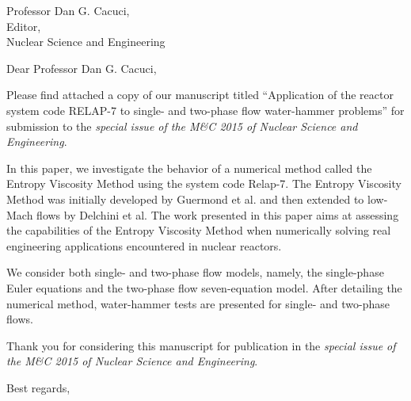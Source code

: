\begin{letter}{Professor Dan G. Cacuci,\\
    Editor,\\
    Nuclear Science and Engineering}
\date{\today}

\opening{Dear Professor Dan G. Cacuci,}
         \vspace{0.25cm}

Please find attached a copy of our manuscript titled ``Application of the reactor system code RELAP-7 to single- and two-phase flow water-hammer problems'' for submission to the {\em special issue of the M\&C 2015 of Nuclear Science and Engineering}.

In this paper, we investigate the behavior of a numerical method called the Entropy Viscosity Method using the system code Relap-7. The Entropy Viscosity Method was initially developed by Guermond et al. and then extended to low-Mach flows by Delchini et al. The work presented in this paper aims at assessing the capabilities of the Entropy Viscosity Method when numerically solving real engineering applications encountered in nuclear reactors.

We consider both single- and two-phase flow models, namely, the single-phase Euler equations and the two-phase flow seven-equation model. After detailing the numerical method, water-hammer tests are presented for single- and two-phase flows.

Thank you for considering this manuscript for publication in the {\it special issue of the M\&C 2015 of Nuclear Science and Engineering}.

\vspace{0.25cm}



\closing{Best regards, }

\end{letter}


